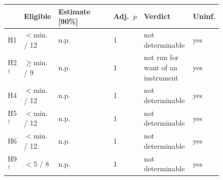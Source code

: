 {\scriptsize\setlength{\tabcolsep}{2pt}
\begin{tabular}{@{}p{0.05\linewidth}p{0.16\linewidth}p{0.30\linewidth}p{0.09\linewidth}p{0.23\linewidth}l@{}}
\toprule
 & Eligible & Estimate [90\%] & Adj.\ $p$ & Verdict & Uninf. \\
\midrule
H1 & $<$min. / 12 & n.p. & 1 & not determinable & yes \\
H2$^{\dagger}$ & $\geq$min. / 9 & n.p. & 1 & not run for want of an instrument & yes \\
H4 & $<$min. / 12 & n.p. & 1 & not determinable & yes \\
H5$^{\dagger}$ & $<$min. / 12 & n.p. & 1 & not determinable & yes \\
H6 & $<$min. / 12 & n.p. & 1 & not determinable & yes \\
H9$^{\dagger}$ & $<$5 / 8 & n.p. & 1 & not determinable & yes \\
\bottomrule
\end{tabular}}
